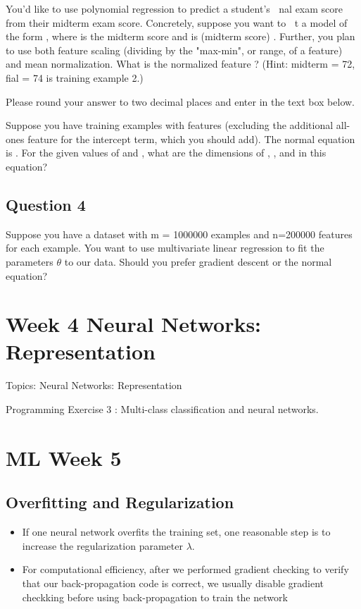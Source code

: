 You'd like to use polynomial regression to predict a student's ჌▘nal exam score
from their midterm exam score. Concretely, suppose you want to ჌▘t a model
of the form , where is the midterm score and
is (midterm score) . Further, you plan to use both feature scaling (dividing
by the "max-min", or range, of a feature) and mean normalization.
What is the normalized feature ? (Hint: midterm = 72, fial = 74 is training
example 2.) 


Please round your answer to two decimal places and enter in
the text box below.


Suppose you have training examples with features (excluding
the additional all-ones feature for the intercept term, which you should add).
The normal equation is . For the given values of and
, what are the dimensions of , , and in this equation?

\subsection{Question 4}
Suppose you have a dataset with m = 1000000 examples and n=200000
features for each example. You want to use multivariate linear regression to
fit the parameters $\theta$ to our data. Should you prefer gradient descent or the
normal equation?



\section{Week 4 Neural Networks: Representation}


Topics: Neural Networks: Representation

Programming Exercise 3 : Multi-class classification and neural networks.


\section{ML Week 5}
\subsection*{Overfitting and Regularization}

\begin{itemize}
\item If one neural network overfits the training set, one reasonable step is to
increase the regularization parameter $\lambda$.
\item For computational efficiency, after we performed gradient checking to verify that our back-propagation 
code is correct, we usually disable gradient checkking before using back-propagation to train
the network
\end{itemize}


